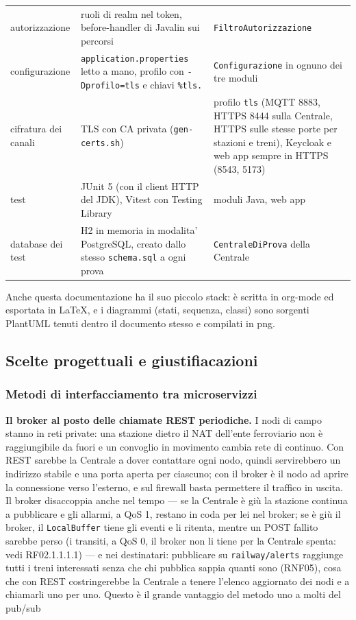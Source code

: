 \documentclass[11pt]{article}
\begin{document}
{\begin{longtable}{L{0.24\textwidth}L{0.36\textwidth}L{0.32\textwidth}}
autorizzazione & ruoli di realm nel token, before-handler di Javalin sui percorsi & \texttt{FiltroAutorizzazione}\\
configurazione & \texttt{application.properties} letto a mano, profilo con \texttt{-Dprofilo=tls} e chiavi \texttt{\%tls.} & \texttt{Configurazione} in ognuno dei tre moduli\\
cifratura dei canali & TLS con CA privata (\texttt{gen-certs.sh}) & profilo \texttt{tls} (MQTT 8883, HTTPS 8444 sulla Centrale, HTTPS sulle stesse porte per stazioni e treni), Keycloak e web app sempre in HTTPS (8543, 5173)\\
test & JUnit 5 (con il client HTTP del JDK), Vitest con Testing Library & moduli Java, web app\\
database dei test & H2 in memoria in modalita' PostgreSQL, creato dallo stesso \texttt{schema.sql} a ogni prova & \texttt{CentraleDiProva} della Centrale\\
\end{longtable}}

Anche questa documentazione ha il suo piccolo stack: è scritta in org-mode ed esportata in
\LaTeX{}, e i diagrammi (stati, sequenza, classi) sono sorgenti PlantUML tenuti dentro il
documento stesso e compilati in png.
\subsection{Scelte progettuali e giustifiacazioni}
\label{sec:org28c1ec9}
\subsubsection{Metodi di interfacciamento tra microservizzi}
\label{sec:org5c5e23d}
\textbf{Il broker al posto delle chiamate REST periodiche.} I nodi di campo stanno in reti private: una
stazione dietro il NAT dell'ente ferroviario non è raggiungibile da fuori e un convoglio in
movimento cambia rete di continuo. Con REST sarebbe la Centrale a dover contattare ogni nodo,
quindi servirebbero un indirizzo stabile e una porta aperta per ciascuno; con il broker è il nodo
ad aprire la connessione verso l'esterno, e sul firewall basta permettere il traffico in uscita.
Il broker disaccoppia anche nel tempo — se la Centrale è giù la stazione continua a pubblicare e
gli allarmi, a QoS 1, restano in coda per lei nel broker; se è giù il broker, il \texttt{LocalBuffer} tiene
gli eventi e li ritenta, mentre un POST fallito sarebbe perso (i transiti, a QoS 0, il broker non li
tiene per la Centrale spenta: vedi RF02.1.1.1.1) — e nei destinatari: pubblicare su \texttt{railway/alerts} raggiunge tutti i treni interessati
senza che chi pubblica sappia quanti sono (RNF05), cosa che con REST costringerebbe la Centrale a
tenere l'elenco aggiornato dei nodi e a chiamarli uno per uno. Questo è il grande vantaggio del metodo uno a molti del pub/sub
\end{document}
